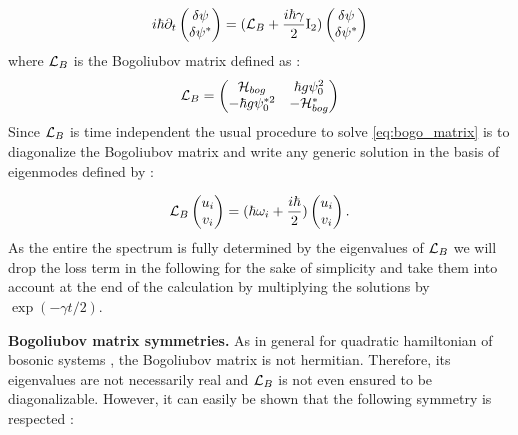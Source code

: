 \begin{equation}
    \begin{matrix}i\hbar \partial_t
        \begin{pmatrix}
             \delta\psi \\
             \delta\psi^*
        \end{pmatrix}
        = (\mathcal{L}_B  +\dfrac{i\hbar\gamma}{2}\mathrm{I_2})
        \begin{pmatrix}
             \delta\psi \\
             \delta\psi^*
        \end{pmatrix}
    \end{matrix}
    \label{eq:bogo_matrix}
\end{equation}
where $\mathcal{L}_B$ is the Bogoliubov matrix defined as :
\begin{equation}
    \begin{matrix}
    \mathcal{L}_B =
    \begin{pmatrix}
        \mathcal{H}_{bog} &  \hbar g \psi_0^2\\
        -\hbar g \psi_0^{*2} & -\mathcal{H}_{bog}^*
    \end{pmatrix}
\end{matrix}
\end{equation} 
Since $\mathcal{L}_B$ is time independent the usual procedure to solve \autoref{eq:bogo_matrix} is to diagonalize the Bogoliubov matrix and write any generic solution 
in the basis of eigenmodes defined by :

\begin{equation}
    \mathcal{L}_B \begin{pmatrix}
        u_{i} \\
        v_{i}
    \end{pmatrix} = (\hbar\omega_i+\dfrac{i\hbar}{2}) \begin{pmatrix}
        u_{i} \\
        v_{i}
    \end{pmatrix}.
\end{equation}
As the entire the spectrum is fully determined by the eigenvalues of $\mathcal{L}_B$ we will drop the loss term in the following for the sake of simplicity and 
take them into account at the end of the calculation by multiplying the solutions by $\exp(-\gamma t/2)$.

\bigskip

\textbf{Bogoliubov matrix symmetries.} As in general for quadratic hamiltonian of bosonic systems \cite{castin_bose-einstein_2001}, the Bogoliubov matrix is not hermitian. Therefore, its eigenvalues are not 
necessarily real and $\mathcal{L}_B$ is not even ensured to be diagonalizable. However, it can easily be shown that the following symmetry is respected :

